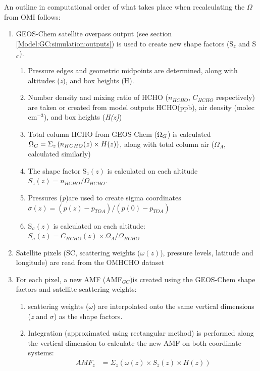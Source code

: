     An outline in computational order of what takes place when recalculating the $\Omega$ from OMI follows:
    \begin{enumerate}
      \item GEOS-Chem satellite overpass output (see section \ref{Model:GC:simulation:outputs}) is used to create new shape factors (S$_z$ and S$_\sigma$).
      \begin{enumerate}
        \item Pressure edges and geometric midpoints are determined, along with altitudes (\textit{z}), and box heights (H).
        \item Number density and mixing ratio of HCHO ($n_{HCHO}$, $C_{HCHO}$ respectively) are taken or created from model outputs HCHO(ppb), air density (molec cm$^{-3}$), and box heights (\textit{H(z)})
        \item Total column HCHO from GEOS-Chem ($\Omega_{G}$) is calculated $\Omega_{G} = \Sigma_z \left(n_{HCHO}(z) \times H(z) \right)$, along with total column air ($\Omega_{A}$, calculated similarly)
        \item The shape factor S$_z(z)$ is calculated on each altitude $S_z(z) = n_{HCHO} / \Omega_{HCHO}$.
        \item Pressures (\textit{p})are used to create sigma coordinates $\sigma(z) = (p(z) - p_{TOA}) / (p(0)-p_{TOA})$
        \item S$_\sigma(z)$ is calculated on each altitude: $S_\sigma(z) = C_{HCHO}(z) \times \Omega_A / \Omega_{HCHO}$
      \end{enumerate}
      \item Satellite pixels (SC, scattering weights ($\omega(z)$), pressure levels, latitude and longitude) are read from the OMHCHO dataset
      \item For each pixel, a new AMF (AMF$_{GC}$)is created using the GEOS-Chem shape factors and satellite scattering weights:
      \begin{enumerate}
        \item scattering weights ($\omega$) are interpolated onto the same vertical dimensions (\textit{z} and $\sigma$) as the shape factors.
        \item Integration (approximated using rectangular method) is performed along the vertical dimension to calculate the new AMF on both coordinate systems:
        \begin{align}
          AMF_z &= \Sigma_z \left(\omega(z) \times S_z(z) \times H(z)\right) \\

\end{align}
\end{enumerate}
\end{enumerate}
